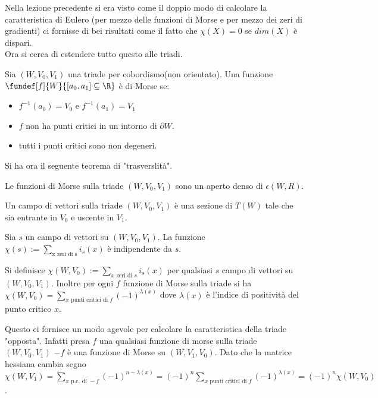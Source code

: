 Nella lezione precedente si era visto come il doppio modo di calcolare la caratteristica di Eulero (per mezzo delle funzioni di Morse e per mezzo dei zeri di gradienti) ci fornisse di bei risultati come il fatto che $\chi(X)=0$ se $dim(X)$ è dispari.\\
Ora si cerca di estendere tutto questo alle triadi. 

\begin{defn}
Sia $(W, V_0, V_1)$ una triade per cobordismo(non orientato). Una funzione $\fundef[f]{W}{[a_0, a_1]\subseteq \R}$ è di Morse se:\\
\begin{itemize}
\item $f^{-1}(a_0)=V_0$ e $f^{-1}(a_1)=V_1$
\item $f$ non ha punti critici in un intorno di $\partial W$.
\item tutti i punti critici sono non degeneri. 
\end{itemize}
\end{defn}

Si ha ora il seguente teorema di "trasverslità".

\begin{teo}
Le funzioni di Morse sulla triade $(W, V_0, V_1)$ sono un aperto denso di $\epsilon(W, R)$.
\end{teo}

\begin{defn}
Un campo di vettori sulla triade $(W, V_0, V_1)$ è una sezione di $T(W)$ tale che sia entrante in $V_0$ e uscente in $V_1$.
\end{defn}
\begin{teo}
Sia $s$ un campo di vettori su $(W, V_0, V_1)$. La funzione $\chi(s):=\sum_{\text{x zeri di s}} i_s(x)$ è indipendente da $s$.
\end{teo}
\begin{defn}
Si definisce $\chi(W, V_0):=\sum_{x\text{ zeri di }s} i_s(x)$ per qualsiasi $s$ campo di vettori su $(W, V_0, V_1)$. Inoltre per ogni $f$ funzione di Morse sulla triade si ha $\chi(W, V_0)=\sum_{x\text{ punti critici di }f} (-1)^{\lambda(x)}$ dove $\lambda(x)$ è l'indice di positività del punto critico $x$.
\end{defn}
\begin{oss}
Questo ci fornisce un modo agevole per calcolare la caratteristica della triade "opposta". Infatti presa $f$ una qualsiasi funzione di morse sulla triade $(W, V_0, V_1)$ $-f$ è una funzione di Morse su $(W, V_1, V_0)$. Dato che la matrice hessiana cambia segno $\chi(W, V_1)=\sum_{x\text{ p.c. di }-f} (-1)^{n-\lambda(x)}=(-1)^n\sum_{x\text{ punti critici di }f}(-1)^{\lambda(x)}=(-1)^n\chi(W, V_0)$.  
\end{oss}

